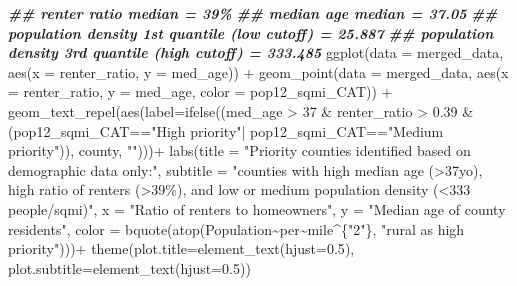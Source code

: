 \documentclass[
]{article}
\newenvironment{Shaded}{\begin{snugshade}}{\end{snugshade}}
\newcommand{\AttributeTok}[1]{\textcolor[rgb]{0.77,0.63,0.00}{#1}}
\newcommand{\DecValTok}[1]{\textcolor[rgb]{0.00,0.00,0.81}{#1}}
\newcommand{\DocumentationTok}[1]{\textcolor[rgb]{0.56,0.35,0.01}{\textbf{\textit{#1}}}}
\newcommand{\FloatTok}[1]{\textcolor[rgb]{0.00,0.00,0.81}{#1}}
\newcommand{\FunctionTok}[1]{\textcolor[rgb]{0.00,0.00,0.00}{#1}}
\newcommand{\NormalTok}[1]{#1}
\newcommand{\SpecialCharTok}[1]{\textcolor[rgb]{0.00,0.00,0.00}{#1}}
\newcommand{\StringTok}[1]{\textcolor[rgb]{0.31,0.60,0.02}{#1}}
\begin{document}
\begin{Shaded}
\begin{Highlighting}[]
\DocumentationTok{\#\# renter ratio median = 39\%}
\DocumentationTok{\#\# median age median = 37.05}
\DocumentationTok{\#\# population density 1st quantile (low cutoff) = 25.887}
\DocumentationTok{\#\# population density 3rd quantile (high cutoff) = 333.485}
\FunctionTok{ggplot}\NormalTok{(}\AttributeTok{data =}\NormalTok{ merged\_data, }\FunctionTok{aes}\NormalTok{(}\AttributeTok{x =}\NormalTok{ renter\_ratio, }\AttributeTok{y =}\NormalTok{ med\_age)) }\SpecialCharTok{+} 
\FunctionTok{geom\_point}\NormalTok{(}\AttributeTok{data =}\NormalTok{ merged\_data, }\FunctionTok{aes}\NormalTok{(}\AttributeTok{x =}\NormalTok{ renter\_ratio, }\AttributeTok{y =}\NormalTok{ med\_age, }
                                   \AttributeTok{color =}\NormalTok{ pop12\_sqmi\_CAT)) }\SpecialCharTok{+}
\FunctionTok{geom\_text\_repel}\NormalTok{(}\FunctionTok{aes}\NormalTok{(}\AttributeTok{label=}\FunctionTok{ifelse}\NormalTok{((med\_age }\SpecialCharTok{\textgreater{}} \DecValTok{37} \SpecialCharTok{\&}\NormalTok{ renter\_ratio }\SpecialCharTok{\textgreater{}} \FloatTok{0.39} 
    \SpecialCharTok{\&}\NormalTok{ (pop12\_sqmi\_CAT}\SpecialCharTok{==}\StringTok{"High priority"}\SpecialCharTok{|}\NormalTok{ pop12\_sqmi\_CAT}\SpecialCharTok{==}\StringTok{"Medium priority"}\NormalTok{)), }
\NormalTok{    county, }\StringTok{""}\NormalTok{)))}\SpecialCharTok{+}
  \FunctionTok{labs}\NormalTok{(}\AttributeTok{title =} \StringTok{"Priority counties identified based on demographic data only:"}\NormalTok{,}
\AttributeTok{subtitle =} \StringTok{"counties with high median age (\textgreater{}37yo), high ratio of renters (\textgreater{}39\%), }
\StringTok{and low or medium population density (\textless{}333 people/sqmi)"}\NormalTok{, }
       \AttributeTok{x =} \StringTok{"Ratio of renters to homeowners"}\NormalTok{, }
       \AttributeTok{y =} \StringTok{"Median age of county residents"}\NormalTok{, }
       \AttributeTok{color =} 
         \FunctionTok{bquote}\NormalTok{(}\FunctionTok{atop}\NormalTok{(Population}\SpecialCharTok{\textasciitilde{}}\NormalTok{per}\SpecialCharTok{\textasciitilde{}}\NormalTok{mile}\SpecialCharTok{\^{}}\NormalTok{\{}\StringTok{"2"}\NormalTok{\}, }\StringTok{"rural as high priority"}\NormalTok{)))}\SpecialCharTok{+}
  \FunctionTok{theme}\NormalTok{(}\AttributeTok{plot.title=}\FunctionTok{element\_text}\NormalTok{(}\AttributeTok{hjust=}\FloatTok{0.5}\NormalTok{),}
        \AttributeTok{plot.subtitle=}\FunctionTok{element\_text}\NormalTok{(}\AttributeTok{hjust=}\FloatTok{0.5}\NormalTok{))}
\end{Highlighting}
\end{Shaded}
\end{document}
